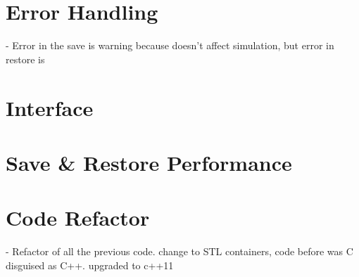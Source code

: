 {\section{Error Handling}
- Error in the save is warning because doesn't affect simulation, but error in restore is 

\section{\Cpp Interface}

\section{Save \& Restore Performance}

\section{Code Refactor}
- Refactor of all the previous code. change to STL containers, code before was C disguised as C++. upgraded to c++11
}